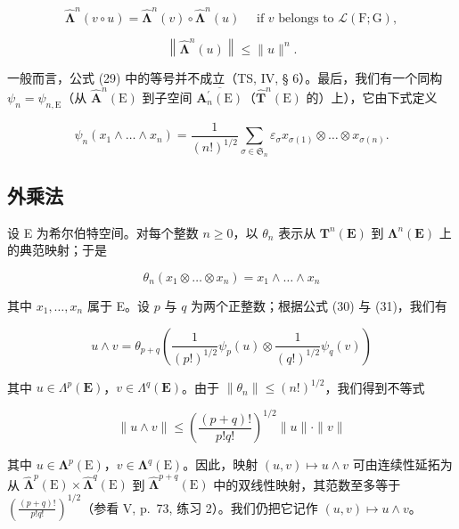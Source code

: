 \[
\hat {\symbf {\Lambda}} ^ {n} (v \circ u) = \hat {\symbf {\Lambda}} ^ {n} (v) \circ \hat {\symbf {\Lambda}} ^ {n} (u) \quad \text { if } v \text { belongs   to } \mathscr {L} (\mathrm{F}; \mathrm{G}),\tag{28}
\]

\[
\left\| \hat {\symbf {\Lambda}} ^ {n} (u) \right\| \leqslant \| u \| ^ {n}.\tag{29}
\]

一般而言，公式 (29) 中的等号并不成立（TS, IV, § 6）。最后，我们有一个同构 \(\psi_{n} = \psi_{n,\mathrm{E}}\)（从 \(\hat{\mathbf{A}}^{n}(\mathrm{E})\) 到子空间 \(\overline{\mathbf{A}_{n}^{\prime}(\mathrm{E})}\)（\(\hat{\mathbf{T}}^{n}(\mathrm{E})\) 的）上），它由下式定义

\[
\psi_ {n} (x _ {1} \wedge \dots \wedge x _ {n}) = \frac {1}{(n !) ^ {1 / 2}} \sum_ {\sigma \in \mathfrak {S} _ {n}} \varepsilon_ {\sigma} x _ {\sigma (1)} \otimes \dots \otimes x _ {\sigma (n)}.\tag{30}
\]

\subsection{外乘法}

设 E 为希尔伯特空间。对每个整数 \(n \geqslant 0\)，以 \(\theta_{n}\) 表示从 \(\mathbf{T}^{n}(\mathbf{E})\) 到 \(\symbf{\Lambda}^{n}(\mathbf{E})\) 上的典范映射；于是

\[
\theta_ {n} (x _ {1} \otimes \ldots \otimes x _ {n}) = x _ {1} \wedge \ldots \wedge x _ {n}\tag{31}
\]

其中 \(x_{1}, \ldots, x_{n}\) 属于 E。设 \(p\) 与 \(q\) 为两个正整数；根据公式 (30) 与 (31)，我们有

\[
u \wedge v = \theta_ {p + q} \left(\frac {1}{(p !) ^ {1 / 2}} \psi_ {p} (u) \otimes \frac {1}{(q !) ^ {1 / 2}} \psi_ {q} (v)\right)\tag{32}
\]

其中 \(u \in \Lambda^p(\mathbf{E})\)，\(v \in \Lambda^q(\mathbf{E})\)。由于 \(\| \theta_n \| \leqslant (n!)^{1/2}\)，我们得到不等式

\[
\| u \wedge v \| \leqslant \left(\frac {(p + q) !}{p ! q !}\right) ^ {1 / 2} \| u \| \cdot \| v \|\tag{33}
\]

其中 \(u \in \symbf{\Lambda}^p(\mathrm{E})\)，\(v \in \symbf{\Lambda}^q(\mathrm{E})\)。因此，映射 \((u, v) \mapsto u \wedge v\) 可由连续性延拓为从 \(\hat{\symbf{\Lambda}}^p(\mathrm{E}) \times \hat{\symbf{\Lambda}}^q(\mathrm{E})\) 到 \(\hat{\symbf{\Lambda}}^{p + q}(\mathrm{E})\) 中的双线性映射，其范数至多等于 \(\left(\frac{(p + q)!}{p!q!}\right)^{1/2}\)（参看 V, p.~73, 练习 2）。我们仍把它记作 \((u, v) \mapsto u \wedge v\)。


